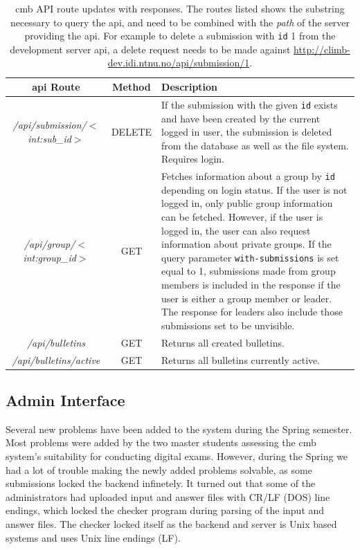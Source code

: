 \begin{table}[h!]
    \centering
    \begin{tabular}{ | c | c | p{4cm} | }
    \hline
    \textbf{\gls{api} Route} & \textbf{Method} & \textbf{Description} \\
    \hline
    \textit{/api/submission/$<$int:sub\_id$>$} & DELETE & If the submission with the given \texttt{id} exists and have been created by the current logged in user, the submission is deleted from the database as well as the file system. Requires login.\\ \hline
    \textit{/api/group/$<$int:group\_id$>$} & GET & Fetches information about a group by \texttt{id} depending on login status. If the user is not logged in, only public group information can be fetched. However, if the user is logged in, the user can also request information about private groups. If the query parameter \texttt{with-submissions} is set equal to 1, submissions made from group members is included in the response if the user is either a group member or leader. The response for leaders also include those submissions set to be unvisible. \\ \hline
    \textit{/api/bulletins} & GET & Returns all created bulletins. \\ \hline
    \textit{/api/bulletins/active} & GET & Returns all bulletins currently active. \\ \hline
    \end{tabular}
    \caption[\gls{cmb} API route updates with responses]{\gls{cmb} API route updates with responses. The routes listed shows the substring necessary to query the \gls{api}, and need to be combined with the \textit{path} of the server providing the \gls{api}. For example to delete a submission with \texttt{id} 1 from the development server \gls{api}, a delete request needs to be made against \url{http://climb-dev.idi.ntnu.no/api/submission/1}.}
    \label{tab:cmb-updated-routes}
\end{table}
\clearpage
\subsection{Admin Interface}
Several new problems have been added to the system during the Spring semester. Most problems were added by the two master students assessing the \gls{cmb} system's suitability for conducting digital exams. However, during the Spring we had a lot of trouble making the newly added problems solvable, as some submissions locked the backend infinetely. It turned out that some of the administrators had uploaded input and answer files with CR/LF (DOS) line endings, which locked the checker program during parsing of the input and answer files. The checker locked itself as the backend and server is Unix based systems and uses Unix line endings (LF). \\

